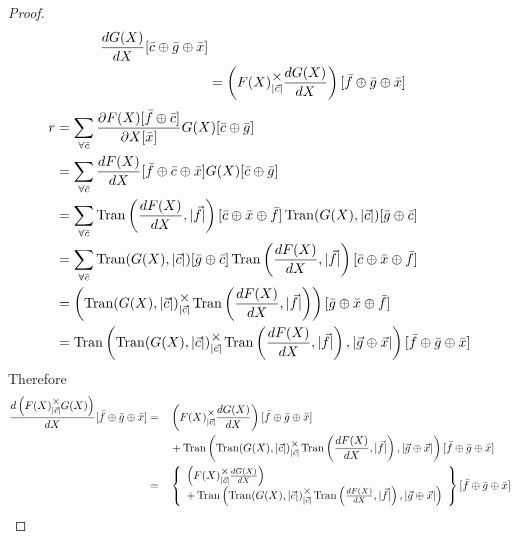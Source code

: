 \documentclass[12pt]{article}
\theoremstyle{definition}
\theoremstyle{plain}
\theoremstyle{ppart}
\DeclareMathOperator{\Tran}{Tran}
\newcommand{\mmult}[1]{\text{\raisebox{1ex}{$\underset{#1}{\times}$}}}
\begin{document}
\begin{landscape}
\begin{proof}
\begin{align*}
    \frac{dG(X)}{dX}[\bar{c} \oplus \bar{g} \oplus \bar{x}] \\
 &=
   \left( F(X) \mmult{|\vec{c}|} \frac{dG(X)}{dX} \right)
   [\bar{f} \oplus \bar{g} \oplus \bar{x}]
\end{align*}
\begin{align*}
 r
 &=
  \sum_{\forall \bar{c}}
    \frac{\partial F(X)[\bar{f} \oplus \bar{c}]}{\partial X[\bar{x}]}
    G(X)[\bar{c} \oplus \bar{g}] \\
 &=
  \sum_{\forall \bar{c}}
    \frac{dF(X)}{dX}[\bar{f} \oplus \bar{c} \oplus \bar{x}]
    G(X)[\bar{c} \oplus \bar{g}] \\
 &=
  \sum_{\forall \bar{c}}
    \Tran\left(\frac{dF(X)}{dX}, |\vec{f}|\right)
      [\bar{c} \oplus \bar{x} \oplus \bar{f}]
    \Tran(G(X), |\vec{c}|)[\bar{g} \oplus \bar{c}] \\
 &=
  \sum_{\forall \bar{c}}
    \Tran(G(X), |\vec{c}|)[\bar{g} \oplus \bar{c}]
    \Tran\left(\frac{dF(X)}{dX}, |\vec{f}|\right)
      [\bar{c} \oplus \bar{x} \oplus \bar{f}] \\
 &=
  \left(
    \Tran(G(X), |\vec{c}|) \mmult{|\vec{c}|}
    \Tran\left(\frac{dF(X)}{dX}, |\vec{f}|\right)
  \right)[\bar{g} \oplus \bar{x} \oplus \bar{f}] \\
 &= 
  \Tran\left(
    \Tran(G(X), |\vec{c}|) \mmult{|\vec{c}|}
    \Tran\left(\frac{dF(X)}{dX}, |\vec{f}|\right)
    , |\vec{g} \oplus \vec{x}|
  \right)[\bar{f} \oplus \bar{g} \oplus \bar{x}]
\end{align*}
Therefore 
\begin{alignat*}{3}
 \frac{d\left(F(X) \mmult{|\vec{c}|} G(X)\right)}{dX}
  [\bar{f} \oplus \bar{g} \oplus \bar{x}]
  &=&&
  \left( F(X) \mmult{|\vec{c}|} \frac{dG(X)}{dX} \right)
  [\bar{f} \oplus \bar{g} \oplus \bar{x}] \\
  &&&+
  \Tran\left(
    \Tran(G(X), |\vec{c}|) \mmult{|\vec{c}|}
    \Tran\left(\frac{dF(X)}{dX}, |\vec{f}|\right)
    , |\vec{g} \oplus \vec{x}|
  \right)[\bar{f} \oplus \bar{g} \oplus \bar{x}] \\
  &=&&
  \left\{
    \begin{array}{l}
      \left( F(X) \mmult{|\vec{c}|} \frac{dG(X)}{dX} \right) \\
      +
      \Tran\left(
        \Tran(G(X), |\vec{c}|) \mmult{|\vec{c}|}
        \Tran\left(\frac{dF(X)}{dX}, |\vec{f}|\right)
        , |\vec{g} \oplus \vec{x}|
      \right)
    \end{array}
  \right\}
  [\bar{f} \oplus \bar{g} \oplus \bar{x}]
\end{alignat*}
\end{proof}
\end{landscape}
\end{document}
